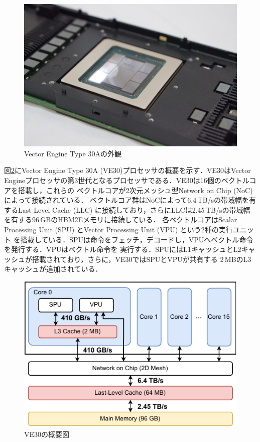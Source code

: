 ﻿\documentclass[submit,techrep,noauthor]{ipsj}
\begin{document}
\begin{figure}
  \centering
  \includegraphics[width=.9\columnwidth]{figs/ve30.jpg}
  \caption{Vector Engine Type 30Aの外観}\label{fig:ve-card}
\end{figure}

図\ref{fig:ve30}にVector Engine Type 30A (VE30)プロセッサの概要を示す．VE30はVector
Engineプロセッサの第3世代となるプロセッサである．VE30は16個のベクトルコアを搭載し，これらの
ベクトルコアが2次元メッシュ型Network on Chip (NoC)によって接続されている．
ベクトルコア群はNoCによって6.4\,TB/sの帯域幅を有するLast Level Cache 
(LLC) に接続しており，さらにLLCは2.45\,TB/sの帯域幅を有する96\,GBのHBM2Eメモリに接続している．
各ベクトルコアはScalar Processing Unit (SPU) とVector Processing Unit (VPU) という2種の実行ユニット
を搭載している．SPUは命令をフェッチ，デコードし，VPUへベクトル命令を発行する．VPUはベクトル命令を
実行する．SPUにはL1キャッシュとL2キャッシュが搭載されており，さらに，VE30ではSPUとVPUが共有する
2\,MBのL3キャッシュが追加されている．

\begin{figure}
  \centering
  \includegraphics{figs/ve30_memory_hierarchy.pdf}
  \caption{VE30の概要図~\cite{Takahashi2023}}\label{fig:ve30}
\end{figure}
\end{document}
